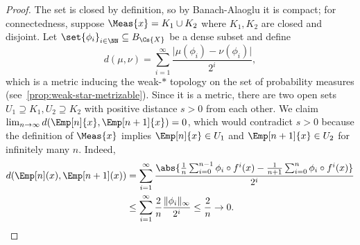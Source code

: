 \documentclass[../main]{subfiles}
\begin{document}
\begin{proof}
  The set is closed by definition, so by Banach-Alaoglu it is compact; for connectedness, suppose \(\Meas{x} = K_1 \cup K_2\) where \(K_1, K_2\) are closed and disjoint.
  Let \(\set{\phi_i}_{i \in \NN} \subseteq B_{\Cs{X}}\) be a dense subset and define
  \begin{equation*}
    d(\mu, \nu) = \sum_{i = 1}^{\infty} \frac{\lvert \mu(\phi_i) - \nu(\phi_i) \rvert}{2^{i}},
  \end{equation*}
  which is a metric inducing the weak-\(\ast\) topology on the set of probability measures (see~\ref{prop:weak-star-metrizable}). Since it is a metric, there are two open sets \(U_1 \supseteq K_1, U_2 \supseteq K_2\) with positive distance \(s > 0\) from each other. We claim \(\lim_{n \to \infty} d(\Emp[n]{x}, \Emp[n + 1]{x}) = 0\), which would contradict \(s > 0\) because the definition of \(\Meas{x}\) implies \(\Emp[n]{x} \in U_1\) and \(\Emp[n + 1]{x} \in U_2\) for infinitely many \(n\).
  Indeed,
  \begin{align*}
    d(\Emp[n](x), \Emp[n + 1](x))
    &= \sum_{i = 1}^{\infty} \frac{\abs{\frac{1}{n}\sum_{i = 0}^{n - 1}\phi_i \circ f^i(x) - \frac{1}{n + 1}\sum_{i = 0}^{n}\phi_i \circ f^i(x)}}{2^{i}}\\
    &\leq \sum_{i = 1}^{\infty} \frac{2}{n}\frac{\lVert \phi_i \rVert_{\infty}}{2^{i}} \leq \frac{2}{n} \to 0.
  \end{align*}
\end{proof}






\end{document}
